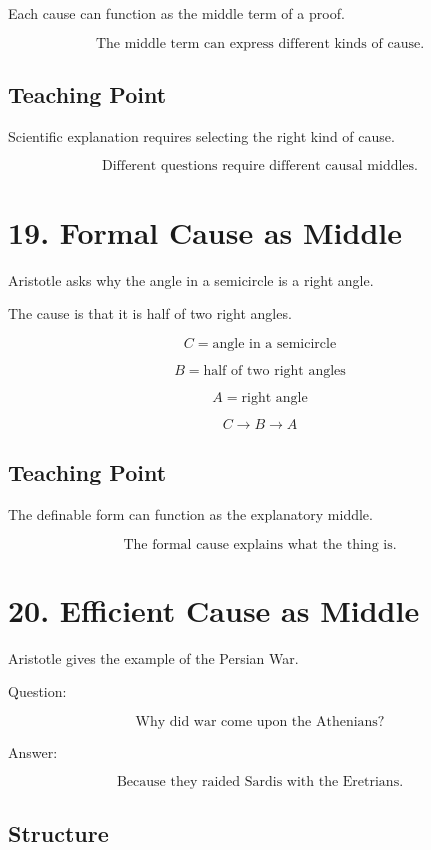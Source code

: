 \documentclass[12pt]{article}
\begin{document}
Each cause can function as the middle term of a proof.

\[
\boxed{
\text{The middle term can express different kinds of cause.}
}
\]

\subsection*{Teaching Point}

Scientific explanation requires selecting the right kind of cause.

\[
\boxed{
\text{Different questions require different causal middles.}
}
\]

\section*{19. Formal Cause as Middle}

Aristotle asks why the angle in a semicircle is a right angle.

The cause is that it is half of two right angles.

\[
C = \text{angle in a semicircle}
\]

\[
B = \text{half of two right angles}
\]

\[
A = \text{right angle}
\]

\[
C \rightarrow B \rightarrow A
\]

\subsection*{Teaching Point}

The definable form can function as the explanatory middle.

\[
\boxed{
\text{The formal cause explains what the thing is.}
}
\]

\section*{20. Efficient Cause as Middle}

Aristotle gives the example of the Persian War.

Question:

\[
\text{Why did war come upon the Athenians?}
\]

Answer:

\[
\text{Because they raided Sardis with the Eretrians.}
\]

\subsection*{Structure}
\end{document}

